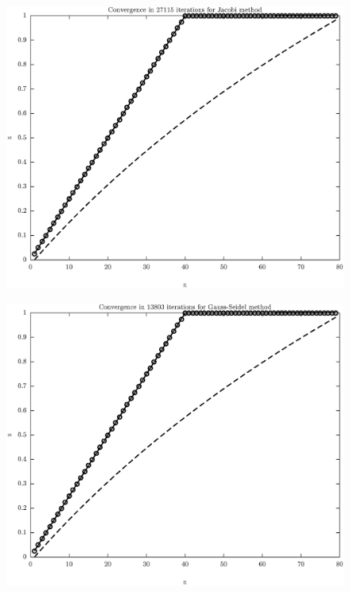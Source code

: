 \documentclass[11pt]{article}
\begin{document}
\begin{figure}
\centering
\begin{minipage}{.45\textwidth}
\centering
\includegraphics[width=\linewidth]{math609_pa2_comp_example_1_n_79_k_Jacobi_part_b.eps}
\label{fig:test1}
\end{minipage}\hfill
\begin{minipage}{.45\textwidth}
\centering
\includegraphics[width=\linewidth]{math609_pa2_comp_example_1_n_79_k_Gauss-Seidel_part_b.eps}

\end{minipage}
\end{figure}
\end{document}
